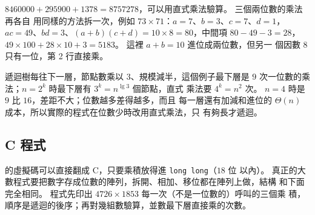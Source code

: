 $8460000 + 295900 + 1378 = 8757278$，可以用直式乘法驗算。 三個兩位數的乘法再各自
用同樣的方法拆一次，例如 $73 \times 71$：$a = 7$、$b = 3$、$c = 7$、$d = 1$，
$ac = 49$、$bd = 3$、$(a+b)(c+d) = 10 \times 8 = 80$，中間項 $80 - 49 - 3 = 28$，
$49 \times 100 + 28 \times 10 + 3 = 5183$。 這裡 $a + b = 10$ 進位成兩位數，但另一
個因數 $8$ 只有一位，第 2 行直接乘。

遞迴樹每往下一層，節點數乘以 $3$、規模減半，這個例子最下層是 $9$ 次一位數的乘法；$n = 2^k$ 時最下層有 $3^k = n^{\lg 3}$ 個節點，直式
乘法要 $4^k = n^2$ 次。 $n = 4$ 時是 $9$ 比 $16$，差距不大；位數越多差得越多，而且
每一層還有加減和進位的 $\Theta(n)$ 成本，所以實際的程式在位數少時改用直式乘法，只
有夠長才遞迴。

\subsection{C 程式}

 的虛擬碼可以直接翻成 C，只要乘積放得進 \texttt{long long}（$18$ 位
以內）。 真正的大數程式要把數字存成位數的陣列，拆開、相加、移位都在陣列上做，結構
和下面完全相同。 程式先印出 $4726 \times 1853$ 每一次（不是一位數的）呼叫的三個乘
積，順序是遞迴的後序；再對幾組數驗算，並數最下層直接乘的次數。

